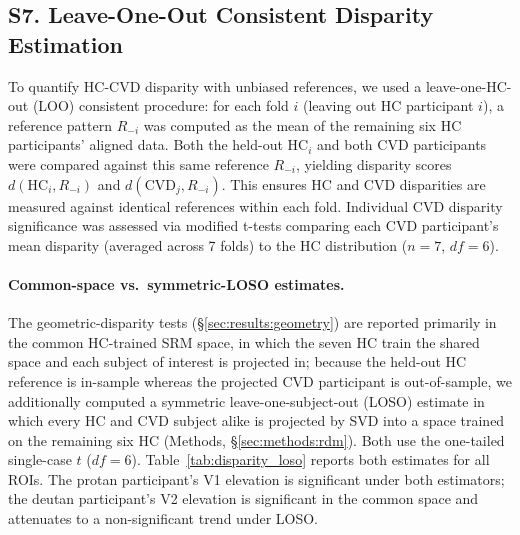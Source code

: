 
\subsection*{\textbf{S7. Leave-One-Out Consistent Disparity Estimation}}

To quantify HC-CVD disparity with unbiased references, we used a leave-one-HC-out (LOO) consistent procedure: for each fold $i$ (leaving out HC participant $i$), a reference pattern $R_{-i}$ was computed as the mean of the remaining six HC participants' aligned data.
Both the held-out $\text{HC}_i$ and both CVD participants were compared against this same reference $R_{-i}$, yielding disparity scores $d(\text{HC}_i, R_{-i})$ and $d(\text{CVD}_j, R_{-i})$.
This ensures HC and CVD disparities are measured against identical references within each fold.
Individual CVD disparity significance was assessed via  modified t-tests comparing each CVD participant's mean disparity (averaged across 7 folds) to the HC distribution ($n=7$, $df=6$).

\paragraph{Common-space vs.\ symmetric-LOSO estimates.}
The geometric-disparity tests (\S\ref{sec:results:geometry}) are reported primarily in the common HC-trained SRM space, in which the seven HC train the shared space and each subject of interest is projected in; because the held-out HC reference is in-sample whereas the projected CVD participant is out-of-sample, we additionally computed a symmetric leave-one-subject-out (LOSO) estimate in which every HC and CVD subject alike is projected by SVD into a space trained on the remaining six HC (Methods, \S\ref{sec:methods:rdm}). Both use the  one-tailed single-case $t$ ($df = 6$). Table~\ref{tab:disparity_loso} reports both estimates for all ROIs. The protan participant's V1 elevation is significant under both estimators; the deutan participant's V2 elevation is significant in the common space and attenuates to a non-significant trend under LOSO.

